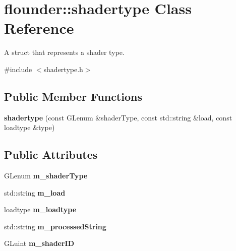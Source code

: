 \hypertarget{classflounder_1_1shadertype}{}\section{flounder\+:\+:shadertype Class Reference}
\label{classflounder_1_1shadertype}


A struct that represents a shader type.  




{\ttfamily \#include $<$shadertype.\+h$>$}

\subsection*{Public Member Functions}
\begin{DoxyCompactItemize}
\item 
\mbox{\label{classflounder_1_1shadertype_ab07bba0e24d93987008aba47fab39187}} 
{\bfseries shadertype} (const G\+Lenum \&shader\+Type, const std\+::string \&load, const loadtype \&type)
\end{DoxyCompactItemize}
\subsection*{Public Attributes}
\begin{DoxyCompactItemize}
\item 
\mbox{\label{classflounder_1_1shadertype_a0533b77290795dd20aceffb5d68aa030}} 
G\+Lenum {\bfseries m\+\_\+shader\+Type}
\item 
\mbox{\label{classflounder_1_1shadertype_a42a77a9e359645f11eb780674c91c99d}} 
std\+::string {\bfseries m\+\_\+load}
\item 
\mbox{\label{classflounder_1_1shadertype_a3e93a4cb120827562d8dea2d51594c0e}} 
loadtype {\bfseries m\+\_\+loadtype}
\item 
\mbox{\label{classflounder_1_1shadertype_a73d54a170e842d9c6a4a1064a3c43516}} 
std\+::string {\bfseries m\+\_\+processed\+String}
\item 
\mbox{\label{classflounder_1_1shadertype_aad36aedac97bf69bc34e168333ce7309}} 
G\+Luint {\bfseries m\+\_\+shader\+ID}
\end{DoxyCompactItemize}


